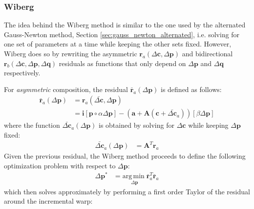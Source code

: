 \subsubsection{Wiberg}
\label{sec:wiberg}

The idea behind the Wiberg method is similar to the one used by the alternated Gauss-Newton method, Section \ref{sec:gauss_newton_alternated}, i.e. solving for one set of parameters at a time while keeping the other sets fixed. However, Wiberg does so by rewriting the asymmetric $\mathbf{r}_a(\Delta\mathbf{c}, \Delta\mathbf{p})$ and bidirectional $\mathbf{r}_b(\Delta\mathbf{c}, \Delta\mathbf{p},\Delta\mathbf{q})$ residuals as functions that only depend on $\Delta\mathbf{p}$ and $\Delta\mathbf{q}$ respectively.

For \emph{asymmetric} composition, the residual $\bar{\mathbf{r}}_a (\Delta \mathbf{p})$ is defined as follows:
\begin{equation}
    \begin{aligned}
        \bar{\mathbf{r}}_a (\Delta \mathbf{p}) & = \mathbf{r}_a(\bar{\Delta \mathbf{c}}, \Delta \mathbf{p})
        \\
        & = \mathbf{i}[\mathbf{p} \circ \alpha \Delta \mathbf{p}] - (\mathbf{a} + \mathbf{A}(\mathbf{c} + \bar{\Delta \mathbf{c}}_a)) [\beta \Delta\mathbf{p}]
    \label{eq:asymmetric_wiberg_residual}
    \end{aligned}
\end{equation}
where the function $\bar{\Delta \mathbf{c}}_a(\Delta \mathbf{p})$ is obtained by solving for $\Delta\mathbf{c}$ while keeping $\Delta\mathbf{p}$ fixed:
\begin{equation}
    \begin{aligned}
        \bar{\Delta \mathbf{c}}_a(\Delta \mathbf{p}) & = \mathbf{A}^T \mathbf{r}_a
        \label{eq:asymmetric_wiberg_c_function}
    \end{aligned}
\end{equation}
Given the previous residual, the Wiberg method proceeds to define the following optimization problem with respect to $\Delta\mathbf{p}$:
\begin{equation}
    \begin{aligned}
        \Delta\mathbf{p}^* & = \underset{\Delta\mathbf{p}}{\mathrm{arg\,min\;}} \bar{\mathbf{r}}_a^T\bar{\mathbf{r}}_a
    \label{eq:asymmetric_wiberg_problem1}
    \end{aligned}
\end{equation}
which then solves approximately by performing a first order Taylor of the residual around the incremental warp:
